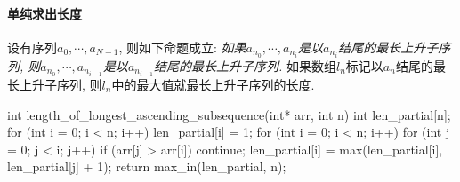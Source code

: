 \documentclass{ctexart}
\begin{document}
\paragraph{单纯求出长度} %
\label{par:单纯求出长度}

设有序列$a_0,\cdots, a_{N-1}$, 则如下命题成立: \emph{如果$a_{n_0}, \cdots, a_{n_i}$是以$a_{n_i}$结尾的最长上升子序列, 则$a_{n_0}, \cdots, a_{n_{i-1}}$是以$a_{n_{i-1}}$结尾的最长上升子序列.} 如果数组$l_n$标记以$a_n$结尾的最长上升子序列, 则$l_n$中的最大值就最长上升子序列的长度.

\begin{cpplst}
int length_of_longest_ascending_subsequence(int* arr, int n)
{
    int len_partial[n];
    for (int i = 0; i < n; i++)
        len_partial[i] = 1;
    for (int i = 0; i < n; i++)
    {
        for (int j = 0; j < i; j++)
        {
            if (arr[j] > arr[i]) continue;
            len_partial[i] = max(len_partial[i],
                len_partial[j] + 1);
        }
    }
    return max_in(len_partial, n);
}
\end{cpplst}




\end{document}
